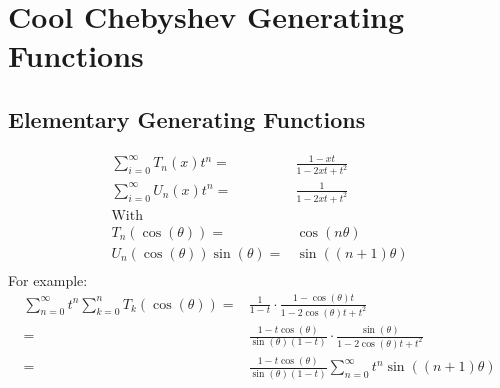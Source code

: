 
\section{Cool Chebyshev Generating Functions}

\subsection{Elementary Generating Functions}

\begin{equation*}
\begin{aligned}
	\sum_{i=0}^{\infty}T_n(x)t^n =& \frac{1-xt}{1-2xt+t^2} \\
	\sum_{i=0}^{\infty}U_n(x)t^n =& \frac{1}{1-2xt+t^2} \\
	\text{With}&\\
	T_n(\cos(\theta)) =& \cos(n\theta)\\
	U_n(\cos(\theta))\sin(\theta) =& \sin((n+1)\theta)\\
\end{aligned}
\end{equation*}
For example:
\begin{equation*}
\begin{aligned}
	\sum_{n=0}^\infty t^n\sum_{k=0}^nT_k(\cos(\theta))
	=& \frac{1}{1-t}\cdot\frac{1-\cos(\theta)t}{1-2\cos(\theta)t+t^2} \\	
	=& \frac{1-t\cos(\theta)}{\sin(\theta)(1-t)}\cdot\frac{\sin(\theta)}{1-2\cos(\theta)t+t^2} \\	
	=& \frac{1-t\cos(\theta)}{\sin(\theta)(1-t)}\sum_{n=0}^{\infty}t^n\sin((n+1)\theta) \\
\end{aligned}
\end{equation*}

